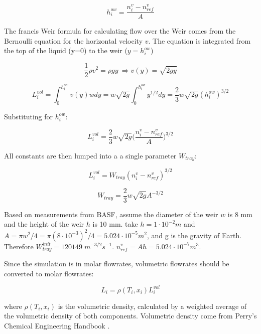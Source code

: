 \begin{equation}
    h^{ow}_i = \frac{n^v_i-n^v_{ref}}{A}
\end{equation}

The francis Weir formula for calculating flow over the Weir comes from the Bernoulli equation for the horizontal velocity $v$. The equation is integrated from the top of the liquid (y=0) to the weir ($y=h_i^{ow}$)

\begin{equation}
    \frac{1}{2} \rho v^2 = \rho g y \ \Longrightarrow v(y) = \sqrt{2gy}
\end{equation}

\begin{equation}
    L_i^{vol} = \int_0^{h_i^{ow}} v(y)wdy = w\sqrt{2g}\int_0^{h_i^{ow}} y^{1/2}dy = \frac{2}{3}w\sqrt{2g}(h_i^{ow})^{3/2} 
\end{equation}


Substituting for $h_i^{ow}$:

\begin{equation}
   L_i^{vol} = \frac{2}{3} w\sqrt{2g}\biggl(\frac{n^v_i-n^v_{ref}}{A}\biggr)^{3/2}  
\end{equation}

All constants are then lumped into a a single parameter $W_{tray}$:

\begin{equation}
    L_i^{vol} = W_{tray}(n_i^v-n^v_{ref})^{3/2}
\end{equation}

\begin{equation}
    W_{tray} = \frac{2}{3}w\sqrt{2g}A^{-3/2}
\end{equation}

Based on measurements from BASF, assume the diameter of the weir $w$ is 8 mm and the height of the weir $h$ is 10 mm. take $h = 1\cdot10^{-2} m$ and $A=\pi w^2/4 = \pi(8 \cdot 10^{-3})^2/4 = 5.024 \cdot 10^{-5} m^2$, and g is the gravity of Earth. Therefore $W_{tray}^{init}=120149 \; m^{-3/2}s^{-1}$. $n^v_{ref}=Ah=5.024 \cdot 10^{-7} m^3$. 

Since the simulation is in molar flowrates, volumetric flowrates should be converted to molar flowrates:

\begin{equation}
    L_i = \rho(T_i, x_i)L^{vol}_i  
\end{equation}


where $\rho(T_i,x_i)$ is the volumetric density, calculated by a weighted average of the volumetric density of both components. Volumetric density come from Perry’s Chemical Engineering Handbook \cite{Perrys2018}.

